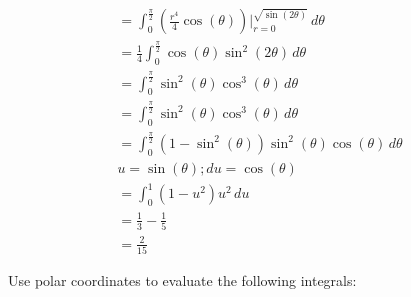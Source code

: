 \documentclass[12pt]{exam}
\begin{document}
\begin{questions}
\begin{solution}
\begin{gather*}
            = \int_{0}^{\frac{\pi}{2}}\left(\frac{r^4}{4}\cos(\theta)\right)|_{r = 0}^{\sqrt{\sin (2\theta)}}\, d\theta \\
            = \frac{1}{4}\int_{0}^{\frac{\pi}{2}} \cos(\theta) \sin^2(2\theta)\, d\theta \\
            = \int_{0}^{\frac{\pi}{2}} \sin^2(\theta)\cos^3(\theta)\, d\theta \\
            = \int_{0}^{\frac{\pi}{2}} \sin^2(\theta)\cos^3(\theta)\, d\theta \\
            = \int_{0}^{\frac{\pi}{2}} (1-\sin^2(\theta))\sin^2(\theta)\cos(\theta)\, d\theta \\
            u = \sin(\theta); du = \cos(\theta) \\
            = \int_{0}^{1} (1-u^2)u^2\, du \\
            = \frac{1}{3} - \frac{1}{5} \\
            = \boxed{ \frac{2}{15} }\tag*{\qed}
        \end{gather*}
    \end{solution}
\clearpage
\question Use polar coordinates to evaluate the following integrals:
\end{questions}
\end{document}
